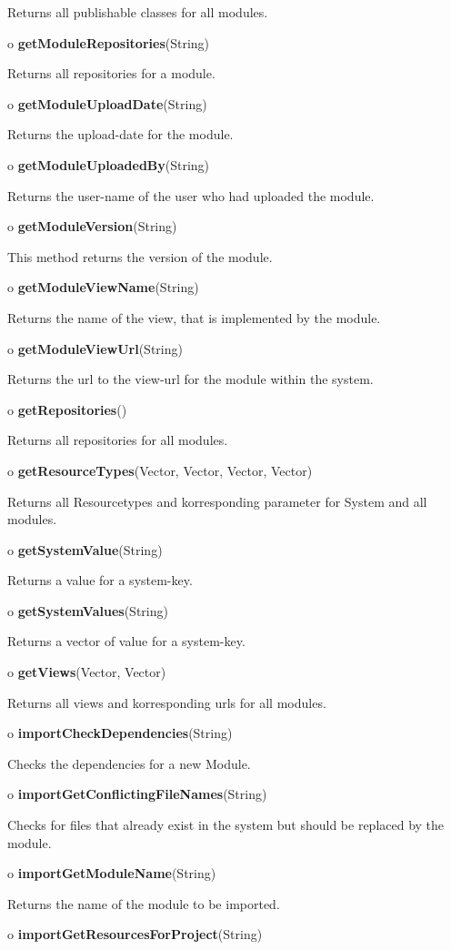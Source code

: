 \begin{description}
Returns all publishable classes for all modules.  
\item o {\bf getModuleRepositories}(String)  

Returns all repositories for a module.  
\item o {\bf getModuleUploadDate}(String)  

Returns the upload-date for the module.  
\item o {\bf getModuleUploadedBy}(String)  

Returns the user-name of the user who had uploaded the module.  
\item o {\bf getModuleVersion}(String)  

This method returns the version of the module.  
\item o {\bf getModuleViewName}(String)  

Returns the name of the view, that is implemented by the module.  
\item o {\bf getModuleViewUrl}(String)  

Returns the url to the view-url for the module within the system.  
\item o {\bf getRepositories}()  

Returns all repositories for all modules.  
\item o {\bf getResourceTypes}(Vector, Vector, Vector, Vector)  

Returns all Resourcetypes and korresponding parameter for System and all
modules.  
\item o {\bf getSystemValue}(String)  

Returns a value for a system-key.  
\item o {\bf getSystemValues}(String)  

Returns a vector of value for a system-key.  
\item o {\bf getViews}(Vector, Vector)  

Returns all views and korresponding urls for all modules.  
\item o {\bf importCheckDependencies}(String)  

Checks the dependencies for a new Module.  
\item o {\bf importGetConflictingFileNames}(String)  

Checks for files that already exist in the system but should be replaced by
the module.  
\item o {\bf importGetModuleName}(String)  

Returns the name of the module to be imported.  
\item o {\bf importGetResourcesForProject}(String)  


\end{description}
